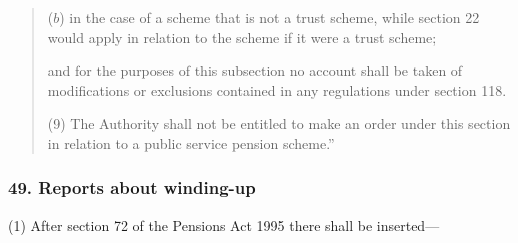 \documentclass[12pt,a4paper]{article}
\begin{document}
\begin{quotation}
\begin{enumerate}
($b$) in the case of a scheme that is not a trust scheme, while section 22 would apply in relation to the scheme if it were a trust scheme;
\end{enumerate}
and for the purposes of this subsection no account shall be taken of modifications or exclusions contained in any regulations under section 118. 

(9) The Authority shall not be entitled to make an order under this section in relation to a public service pension scheme.”
\end{quotation}

\subsubsection{49. Reports about winding-up}

(1) After section 72 of the Pensions Act 1995 there shall be inserted—
\end{document}
